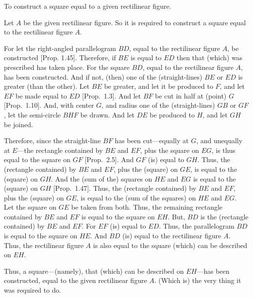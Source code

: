 \begin{Parallel}{}{}
{To construct a square equal to a given rectilinear figure.

Let $A$ be the given rectilinear figure. So it is required to construct a
square equal to the rectilinear figure $A$.

\epsfysize=2in
\centerline{}

For let the right-angled parallelogram $BD$,  equal to
the rectilinear figure $A$, be constructed  [Prop. 1.45]. Therefore, if $BE$ is equal to $ED$ then
that (which) was prescribed has taken place. For the square $BD$, equal to the rectilinear figure $A$,
has been constructed. And if not, (then)
one of the (straight-lines) $BE$ or $ED$ is greater (than the other). Let $BE$ be greater, and let it be
produced to $F$, and let $EF$ be made equal to $ED$ [Prop.~1.3].
And let $BF$ be cut in half at (point) $G$ [Prop.~1.10]. And, with center $G$, and
radius one of the (straight-lines) $GB$ or $GF$, let the semi-circle $BHF$ be drawn.
And let $DE$ be produced to $H$, and let $GH$ be joined.

Therefore, since the straight-line $BF$ has been cut---equally at $G$,
and unequally at $E$---the rectangle contained by $BE$ and $EF$, plus the
square on $EG$, is thus equal to the square on $GF$ [Prop.~2.5]. And $GF$ (is)
equal to $GH$. Thus, the (rectangle contained) by $BE$ and $EF$, plus the
(square) on $GE$, is equal to the (square) on $GH$. And the (sum of the) squares on $HE$ and $EG$  is equal to the (square)
on $GH$  [Prop.~1.47].
Thus, the (rectangle contained) by $BE$ and $EF$, plus the (square) on $GE$, is
equal to the (sum of the squares) on $HE$ and $EG$.
Let the square on $GE$ be taken from both. Thus, the remaining
rectangle contained by $BE$ and $EF$ is equal to the square
on $EH$. But, $BD$ is the (rectangle contained) by $BE$ and $EF$. For $EF$ (is)
equal to $ED$. Thus, the parallelogram $BD$ is equal to the square on $HE$.
And $BD$ (is) equal to the rectilinear figure $A$. Thus, the rectilinear figure
$A$ is also equal to the square (which) can be described on $EH$.

Thus, a 
square---(namely), that (which) can be described on $EH$---has been constructed, equal
to the given rectilinear figure $A$. (Which is) the very thing it was required to do.}
\end{Parallel}
